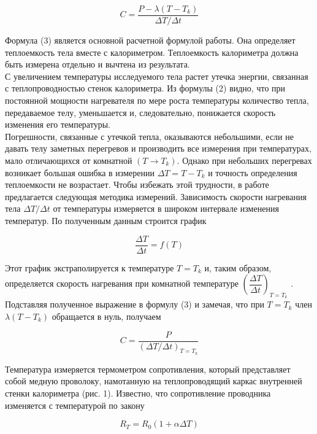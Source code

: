 \documentclass[12pt,a4paper]{article}
\begin{document}
	\begin{equation}
		C = \dfrac{P - \lambda(T - T_k)}{\Delta T / \Delta t}
	\end{equation}
	
	Формула (3) является основной расчетной формулой работы. Она определяет теплоемкость тела вместе с калориметром. Теплоемкость калориметра должна быть измерена отдельно и вычтена из результата.\\
	С увеличением температуры исследуемого тела растет утечка энергии, связанная с теплопроводностью стенок калориметра. Из формулы (2) видно, что при постоянной мощности нагревателя по мере роста температуры количество тепла, передаваемое телу, уменьшается и, следовательно, понижается скорость изменения его температуры.\\
	Погрешности, связанные с утечкой тепла, оказываются небольшими, если не давать телу заметных перегревов и производить все измерения при температурах, мало отличающихся от комнатной $(T \rightarrow T_k)$. Однако при небольших перегревах возникает большая ошибка в измерении $\Delta T = T - T_k$ и точность определения теплоемкости не возрастает. Чтобы избежать этой трудности, в работе предлагается следующая методика измерений. Зависимость скорости нагревания тела $\Delta T / \Delta t$ от температуры измеряется в широком интервале изменения температур. По полученным данным строится график
	
	\begin{equation*}
		\dfrac{\Delta T}{\Delta t} = f(T)
	\end{equation*}
	
	Этот график экстраполируется к температуре $T=T_k$ и, таким образом, определяется скорость нагревания при комнатной температуре $\left( \dfrac{\Delta T}{\Delta t} \right)_{T=T_k}$ . Подставляя полученное выражение в формулу (3) и замечая, что при $T=T_k$ член $\lambda(T- T_k)$ обращается в нуль, получаем
	
	\begin{equation}
		C = \dfrac{P}{(\Delta T / \Delta t)_{T=T_k}}
	\end{equation}
	
	Температура измеряется термометром сопротивления, который представляет собой медную проволоку, намотанную на теплопроводящий каркас внутренней стенки калориметра (рис. 1). Известно, что сопротивление проводника изменяется с температурой по закону
	
	\begin{equation}
		R_T = R_0 (1 + \alpha \Delta T)
	\end{equation}
	
\end{document}
